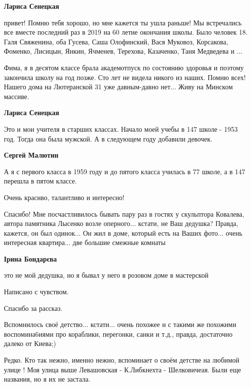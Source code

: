 \begin{itemize}
\begin{itemize}
\begin{itemize}
\textbf{Лариса Сенецкая} 

привет! Помню тебя хорошо, но мне кажется ты ушла раньше! Мы встречались все
вместе последний раз в 2019 на 60 летие окончания школы. Было человек 18. Галя
Свяженина, оба Гусева, Саша Олофинский, Вася Муковоз, Корсакова, Фоменко,
Лисицын, Янкин, Ячменев, Терехова, Казаченко, Таня Медведева и ...


Фима, я в десятом классе брала академотпуск по состоянию здоровья и поэтому
закончила школу на год позже. Сто лет не видела никого из наших. Помню всех!
Нашего дома на Лютеранской 31 уже давным-давно нет... Живу на Минском массиве.

\textbf{Лариса Сенецкая} 

Это и мои учителя в старших классах. Начало моей учебы в 147 школе - 1953 год.
Тогда она была мужской. А в следующем году добавили девочек.

\textbf{Сергей Малютин}

А я с первого класса в 1959 году и до пятого класса училась в 77 школе, а в 147
перешла в пятом классе.

\end{itemize} %

\end{itemize} %


Очень красиво, талантливо и интересно!

Спасибо! Мне посчастливилось бывать пару раз в гостях у скульптора Ковалева,
автора памятника Лысенко возле оперного... кстати, не Ваш дедушка? Правда,
кажется, он был одинок... Он жил в доме, который есть на Ваших фото... очень
интересная квартира... две большие смежные комнаты

\textbf{Ірина Бондарєва} 

это не мой дедушка, но я бывал у него в розовом доме в мастерской


Написано с чувством.

Спасибо за рассказ.

Вспомнилось своё детство... кстати... очень похожее и с такими же похожими
воспомина6иями про кораблики, перегонки, санки и т.д., правда, достаточно
далеко от Киева;)


Редко. Кто так нежно, именно нежно, вспоминает о своём детстве на любимой
улице ! Моя улица выше Левашовская - К.Либкнехта - Шелковичеая. Были еще
названия, но я их не застала.


\end{itemize}

